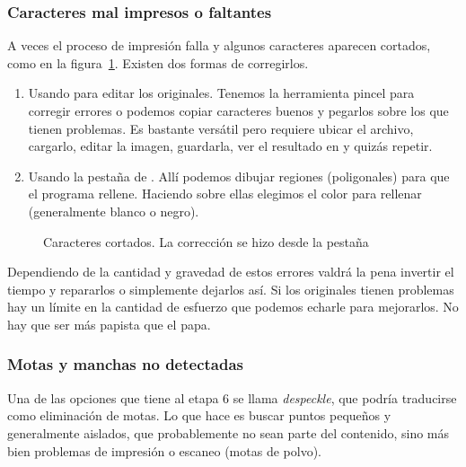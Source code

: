 \documentclass[%
	a5paper,
	10pt,
	twoside,
	openright,
	final,
]{memoir}
\begin{document}
	\subsubsection{Caracteres mal impresos o faltantes} A veces el proceso de impresión falla y algunos caracteres aparecen cortados, como en la figura~\ref{fig:SToutputBadChars}. Existen dos formas de corregirlos.
	\begin{enumerate}
		\item Usando \gimp para editar los originales. Tenemos la herramienta pincel para corregir errores o podemos copiar caracteres buenos y pegarlos sobre los que tienen problemas. Es bastante versátil pero requiere ubicar el archivo, cargarlo, editar la imagen, guardarla, ver el resultado en \scantailor y quizás repetir. %
		\item Usando la pestaña  de \scantailor. Allí podemos dibujar regiones (poligonales) para que el programa rellene. Haciendo  sobre ellas elegimos el color para rellenar (generalmente blanco o negro).
	\end{enumerate}

	\begin{figure}
		\hfill
		\hfill
		\caption[Caracteres cortados]{Caracteres cortados. La corrección se hizo desde la pestaña \label{fig:SToutputBadChars}}
	\end{figure}

	Dependiendo de la cantidad y gravedad de estos errores valdrá la pena invertir el tiempo y repararlos o simplemente dejarlos así. %
	Si los originales tienen problemas hay un límite en la cantidad de esfuerzo que podemos echarle para mejorarlos. No hay que ser más papista que el papa. %

	\subsubsection{Motas y manchas no detectadas} Una de las opciones que tiene al etapa 6 se llama \emph{despeckle}, que podría traducirse como eliminación de motas. Lo que hace es buscar puntos pequeños y generalmente aislados, que probablemente no sean parte del contenido, sino más bien problemas de impresión o escaneo (motas de polvo).
\end{document}
